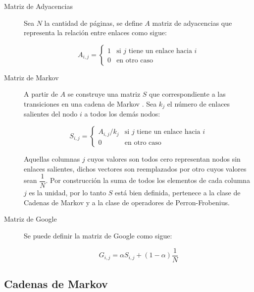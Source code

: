 \documentclass{article}
\begin{document}
\begin{description}
\item[Matriz de Adyacencias]

Sea $N$ la cantidad de páginas, se define $A$ matriz de adyacencias que representa la relación entre enlaces como sigue:

\begin{equation} \label{eq:A}
A_{i,j} =
\left\{
	\begin{array}{ll}
		1  & \mbox{si $j$ tiene un enlace hacia $i$}\\
		0 & \mbox{en otro caso } 
	\end{array}
\right.
\end{equation}

\item[Matriz de Markov]
A partir de $A$ se construye una matriz $S$ que correspondiente a las transiciones en una cadena de Markov \cite{10261393320130701}. Sea $k_j$ el número de enlaces salientes del nodo $i$ a todos los demás nodos:

\begin{equation} \label{eq:S}
S_{i,j} =
\left\{
	\begin{array}{ll}
		A_{i,j}/k_{j}  & \mbox{si $j$ tiene un enlace hacia $i$}\\
		0 & \mbox{en otro caso } 
	\end{array}
\right.
\end{equation}

Aquellas columnas $j$ cuyos valores son todos cero representan nodos sin enlaces salientes, dichos vectores son reemplazados por otro cuyos valores sean $\dfrac {1} {N}$.
Por construcción la suma de todos los elementos de cada columna $j$ es la unidad, por lo tanto $S$ está bien definida, pertenece a la clase de Cadenas de Markov y a la clase de operadores de Perron-Frobenius.

\item[Matriz de Google]

Se puede definir la matriz de Google como sigue:

\begin{equation} \label{eq:G}
G_{i,j} = \alpha S_{i,j} + (1-\alpha) \dfrac {1} {N}
\end{equation}

\end{description} 

\subsection{Cadenas de Markov}
\end{document}
